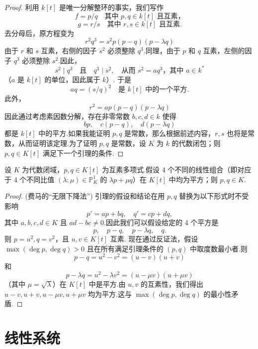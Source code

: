 \begin{proof}
利用 \(k[t]\) 是唯一分解整环的事实，我们写作
\[
f = p/q \quad \text{其中 } p, q \in k[t] \text{ 且互素，}
\]
\[
g = r/s \quad \text{其中 } r, s \in k[t] \text{ 且互素.}
\]
去分母后，原方程变为
\[
r^2 q^3 = s^2 p(p-q)(p-\lambda q)
\]
由于 \(r\) 和 \(s\) 互素，右侧的因子 \(s^2\) 必须整除 \(q^3\).同理，由于 \(p\) 和 \(q\) 互素，左侧的因子 \(q^3\) 必须整除 \(s^2\).因此，
\[
s^2 \mid q^3 \quad \text{且} \quad q^3 \mid s^2, \quad \text{从而 } s^2 = a q^3 \text{，其中 } a \in k^*
\]
（\(a\) 是 \(k[t]\) 的单位，因此属于 \(k\)）.
于是
\[
aq = (s/q)^2 \quad \text{是 } k[t] \text{ 中的一个平方.}
\]
此外，
\[
r^2 = a p(p-q)(p-\lambda q)
\]
因此通过考虑素因数分解，存在非零常数 \(b, c, d \in k\) 使得
\[
bp, \quad c(p-q), \quad d(p-\lambda q)
\]
都是 \(k[t]\) 中的平方.如果我能证明 \(p, q\) 是常数，那么根据前述内容，\(r, s\) 也将是常数，从而证明该定理.为了证明 \(p, q\) 是常数，设 \(K\) 为 \(k\) 的代数闭包；则 \(p, q \in K[t]\) 满足下一个引理的条件.
\end{proof}

\begin{lemma}
设 \(K\) 为代数闭域，\(p, q \in K[t]\) 为互素多项式.假设 4 个不同的线性组合（即对应于 4 个不同比值 \((\lambda : \mu) \in \mathbb{P}^1_K\) 的 \(\lambda p + \mu q\)）在 \(K[t]\) 中均为平方；则 \(p, q \in K\).
\end{lemma}

\begin{proof} (费马的“无限下降法”)
引理的假设和结论在用 \(p, q\) 替换为以下形式时不受影响
\[
p' = ap + bq, \quad q' = cp + dq,
\]
其中 \(a, b, c, d \in K\) 且 \(ad - bc \neq 0\).因此我们可以假设给定的 4 个平方是
\[
p, \quad p-q, \quad p-\lambda q, \quad q.
\]
则 \(p = u^2, q = v^2\)，且 \(u, v \in K[t]\) 互素.
现在通过反证法，假设 \(\max(\deg p, \deg q) > 0\) 且在所有满足引理条件的 \((p, q)\) 中取度数最小者.则
\[
p - q = u^2 - v^2 = (u-v)(u+v)
\]
和
\[
p - \lambda q = u^2 - \lambda v^2 = (u - \mu v)(u + \mu v)
\]
（其中 \(\mu = \sqrt{\lambda}\)）在 \(K[t]\) 中是平方.由 \(u, v\) 的互素性，我们得出 \(u-v, u+v, u-\mu v, u+\mu v\) 均为平方.这与 \(\max(\deg p, \deg q)\) 的最小性矛盾.
\end{proof}

\section{线性系统}\label{sec:linear-systems}

